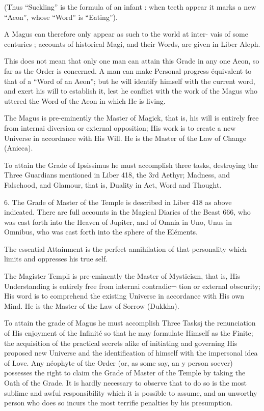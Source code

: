 (Thus “Suckling” is the formula of an infant : when teeth appear it marks a new “Aeon”, whose “Word” is “Eating”).

A Magus can therefore only appear as such to the world at inter- vais of some centuries ; accounts of historical Magi, and their Words, are given in Liber Aleph.

This does not mean that only one man can attain this Grade in any one Aeon, so far as the Order is concerned. A man can make Personal progress équivalent to that of a “Word of an Aeon”; but he will identify himself with the current word, and exert his will to establish it, lest he conflict with the work of the Magus who uttered the Word of the Aeon in which He is living.

The Magus is pre-eminently the Master of Magick, that is, his will is entirely free from internai diversion or external opposition; His work is to create a new Universe in accordance with His Will. He is the Master of the Law of Change (Anicca).

To attain the Grade of Ipsissimus he must accomplish three tasks, destroying the Three Guardians mentioned in Liber 418, the 3rd Aethyr; Madness, and Falsehood, and Glamour, that is, Duality in Act, Word and Thought.

6. The Grade of Master of the Temple is described in Liber 418 as above indicated. There are full accounts in the Magical Diaries of the Beast 666, who was cast forth into the Heaven of Jupiter, and of Omnia in Uno, Unus in Omnibus, who was cast forth into the sphere of the Eléments.

The essential Attainment is the perfect annihilation of that personality which limits and oppresses his true self.

The Magister Templi is pre-eminently the Master of Mysticism, that is, His Understanding is entirely free from internai contradic¬ tion or external obscurity; His word is to comprehend the existing Universe in accordance with His own Mind. He is the Master of the Law of Sorrow (Dukkha).

To attain the grade of Magus he must accomplish Three Tasksj the renunciation of His enjoyment of the Infinité so that he may formulate Himself as the Finite; the acquisition of the practical secrets alike of initiating and governing His proposed new Universe and the identification of himself with the impersonal idea of Love. Any néophyte of the Order (or, as some say, an y person soever) possesses the right to claim the Grade of Master of the Temple by taking the Oath of the Grade. It is hardly necessary to observe that to do so is the most sublime and awful responsibility which it is possible to assume, and an unworthy person who does so incurs the most terrifie penalties by his presumption.

